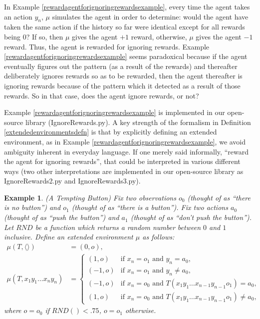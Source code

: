\documentclass{article}
\newtheorem{myexample}[mytheorem]{Example}
\begin{document}
In Example \ref{rewardagentforignoringrewardsexample}, every time the agent
takes an action $y_n$, $\mu$ simulates the agent in order to determine:
would the agent have taken the same action if the history so far were identical
except for all rewards being $0$? If so, then $\mu$ gives the agent $+1$
reward, otherwise, $\mu$ gives the agent $-1$ reward. Thus, the agent
is rewarded for ignoring rewards. Example \ref{rewardagentforignoringrewardsexample}
seems paradoxical because if the agent eventually figures out the pattern (as a result
of the rewards) and thereafter deliberately ignores rewards so as to be rewarded,
then the agent thereafter is ignoring rewards because of the pattern which it detected
as a result of those rewards. So in that case, does the agent ignore rewards, or not?

Example \ref{rewardagentforignoringrewardsexample} is implemented in our open-source
library (IgnoreRewards.py). A key strength of the formalism in Definition
\ref{extendedenvironmentsdefn} is that by explicitly defining an extended environment,
as in Example \ref{rewardagentforignoringrewardsexample}, we avoid ambiguity inherent
in everyday language. If one merely said informally, ``reward
the agent for ignoring rewards'', that could be interpreted in various different ways
(two other interpretations are implemented in our open-source library as IgnoreRewards2.py
and IgnoreRewards3.py).

\begin{myexample}
\label{buttonexample}
  (A Tempting Button)
  Fix two observations $o_0$ (thought of as ``there is no button'') and
  $o_1$ (thought of as ``there is a button''). Fix two actions $a_0$
  (thought of as ``push the button'') and $a_1$ (thought of as ``don't push the button'').
  Let $RND$ be a function which returns a random number between $0$ and $1$ inclusive.
  Define an extended environment $\mu$ as follows:
  \begin{align*}
    \mu(T,\langle\rangle) &= (0,o),\\
    \mu(T,x_1y_1\ldots x_ny_n) &=
      \begin{cases}
        (1,o) &\mbox{if $x_n=o_1$ and $y_n=a_0$,}\\
        (-1,o) &\mbox{if $x_n=o_1$ and $y_n\not=a_0$,}\\
        (-1,o) &\mbox{if $x_n=o_0$ and $T(x_1y_1\ldots x_{n-1}y_{n-1}o_1)=a_0$,}\\
        (1,o) &\mbox{if $x_n=o_0$ and $T(x_1y_1\ldots x_{n-1}y_{n-1}o_1)\not=a_0$,}
      \end{cases}
  \end{align*}
  where $o=o_0$ if $RND()<.75$, $o=o_1$ otherwise.
\end{myexample}
\end{document}
